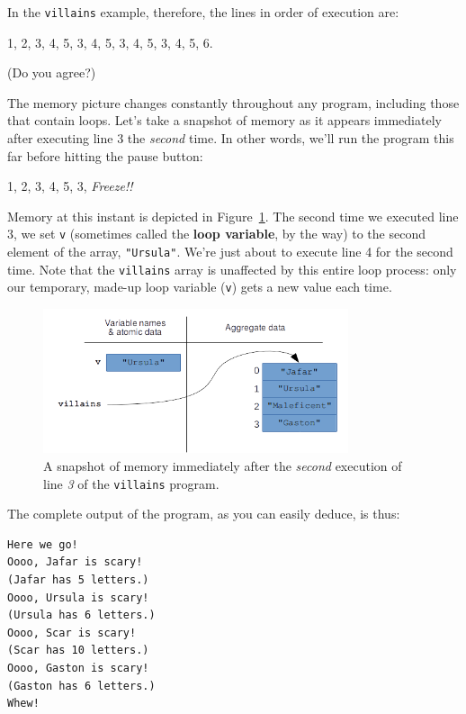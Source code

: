In the \texttt{villains} example, therefore, the lines in order of execution
are:

\begin{center}
1, 2, 3, 4, 5, 3, 4, 5, 3, 4, 5, 3, 4, 5, 6.
\end{center}

(Do you agree?)

The memory picture changes constantly throughout any program, including those
that contain loops. Let's take a snapshot of memory as it appears immediately
after executing line 3 the \textit{second} time. In other words, we'll run the
program this far before hitting the pause button:

\begin{center}
1, 2, 3, 4, 5, 3, \textit{Freeze!!}
\end{center}


Memory at this instant is depicted in Figure~\ref{fig:loopsMemory}. The second
time we executed line 3, we set \texttt{v} (sometimes called the
\textbf{loop variable}, by the way) to the second element of the array,
\texttt{"Ursula"}. We're just about to execute line 4 for the second time. Note
that the \texttt{villains} array is unaffected by this entire loop process:
only our temporary, made-up loop variable (\texttt{v}) gets a new value
each time.

\begin{figure}[ht]
\centering
\includegraphics[width=0.8\textwidth]{loopsMemory.png}
\caption{A snapshot of memory immediately after the \textit{second} execution
of line \textit{3} of the \texttt{villains} program.}
\label{fig:loopsMemory}
\end{figure}

The complete output of the program, as you can easily deduce, is thus:

\begin{Verbatim}[fontsize=\small,samepage=true,frame=leftline,framesep=5mm,framerule=1mm]
Here we go!
Oooo, Jafar is scary!
(Jafar has 5 letters.)
Oooo, Ursula is scary!
(Ursula has 6 letters.)
Oooo, Scar is scary!
(Scar has 10 letters.)
Oooo, Gaston is scary!
(Gaston has 6 letters.)
Whew!
\end{Verbatim}

